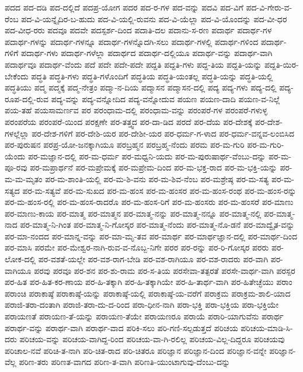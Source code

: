 {ಪದದ
ಪದ-ದಡಿ
ಪದ-ದಲ್ಲಿದೆ
ಪದಪ್ರ-ಯೋಗ
ಪದರ
ಪದ-ರ-ಗಳ
ಪದ-ವನ್ನು
ಪದವಿ
ಪದ-ವಿಗೆ
ಪದ-ವಿ-ಗೇರು-ವ-ರೆಂಬ
ಪದ-ವಿ-ಯನ್ನೈದಿರ-ಬ-ಹುದು
ಪದ-ವಿ-ಯಲ್ಲಿ-ರುವನು
ಪದ-ವಿ-ಯೆಲ್ಲಾ
ಪದ-ವಿ-ಯೊಂದನ್ನು
ಪದ-ವೀ-ಧರ
ಪದ-ವೀಧ-ರರು
ಪದವೂ
ಪದವೇ
ಪದಸ್ಪರ್ಶ-ದಿಂದ
ಪದಾತಿ-ದಲ
ಪದಾನು-ಸ-ರಣ
ಪದಾರ್ಥ
ಪದಾರ್ಥ-ಗಳ
ಪದಾರ್ಥ-ಗಳನ್ನು
ಪದಾರ್ಥ-ಗಳನ್ನೂ
ಪದಾರ್ಥ-ಗಳನ್ನೊದಗಿ-ಸಲು
ಪದಾರ್ಥ-ಗಳಲ್ಲಿ
ಪದಾರ್ಥ-ಗಳಿಂದ
ಪದಾರ್ಥ-ಗಳಿಗೆ
ಪದಾರ್ಥ-ಗಳು
ಪದಾರ್ಥ-ಗಳೆಲ್ಲಾ
ಪದಾರ್ಥದ
ಪದಾರ್ಥ-ದಲ್ಲಿಯೂ
ಪದಾರ್ಥ-ವನ್ನು
ಪದಾರ್ಥ-ವಾಗಿ
ಪದಾರ್ಥವೂ
ಪದಾರ್ಥ-ವೆಂದು
ಪದೆ
ಪದೇ
ಪದೇ-ಪದೇ
ಪದ್ದತಿ
ಪದ್ದತಿ-ಗಳು
ಪದ್ದ-ತಿಯ
ಪದ್ದತಿ-ಯನ್ನು
ಪದ್ದತಿ-ಯಿರ-ಬೇಕೆಂದು
ಪದ್ಧತಿ
ಪದ್ಧತಿ-ಗಳು
ಪದ್ಧತಿ-ಗಳೊಂದಿಗೆ
ಪದ್ಧತಿಯ
ಪದ್ಧತಿ-ಯಂತಲ್ಲ
ಪದ್ಧತಿ-ಯನ್ನು
ಪದ್ಧತಿ-ಯಲ್ಲಿ
ಪದ್ಧತಿಯು
ಪದ್ಮ
ಪದ್ಮಕ್ಕೆ
ಪದ್ಮ-ನೇತ್ರಂ
ಪದ್ಮಾ-ನ-ದಿಯ
ಪದ್ಮಾಸನ
ಪದ್ಮಾಸನ-ದಲ್ಲಿ
ಪದ್ಯ
ಪದ್ಯ-ಗಳು
ಪದ್ಯ-ದಲ್ಲಿ
ಪದ್ಯ-ರೂಪ-ದಲ್ಲಿ-ರುವ
ಪದ್ಯ-ವನ್ನು
ಪದ್ಯ-ವನ್ನೋದಿದ
ಪದ್ಯ-ವನ್ನೋದುವ
ಪಯಣ
ಪಯಣ-ದಾದಿ
ಪಯಣ-ವ-ನಿಲ್ಲೆ
ಪಯ-ತಹೆ
ಪಯಸಾಮರ್ಣವ
ಪರ
ಪರಂಧಾಮ-ದಲ್ಲಿ
ಪರಂಧಾಮ-ವನ್ನು
ಪರಂಪರೆ-ಗಳ
ಪರಂಪರೆ-ಗಳುಳ್ಳ
ಪರಂಪರೆಯ
ಪರಂಪರೆ-ಯಿಂದ
ಪರಕ್ಷಣೇ
ಪರ-ತತ್ತ್ವದ
ಪರ-ದಾ-ಡಿದ
ಪರದೆ
ಪರ-ದೆಯ
ಪರ-ದೇಶಕ್ಕೆ
ಪರ-ದೇಶ-ಗಳಲ್ಲೆಲ್ಲಾ
ಪರ-ದೇಶ-ಗಳಿಗೆ
ಪರ-ದೇಶಿ-ಯರ
ಪರ-ದೇಶೀ-ಯರ
ಪರ-ಧರ್ಮ-ಗ-ಳಾದ
ಪರ-ಧರ್ಮ-ವನ್ನವ-ಲಂಬಿಸಿದ
ಪರ-ಪುರುಷನ
ಪರಪ್ರ-ಯೋ-ಜನಕ್ಕಾಗಿಯೂ
ಪರಬ್ರಹ್ಮನ
ಪರಬ್ರಹ್ಮ-ನೆಂದು
ಪರಮ
ಪರ-ಮ-ಗುರಿ
ಪರ-ಮ-ಗುರಿ-ಯೆಂದು
ಪರ-ಮಜ್ಞಾನ-ದಲ್ಲಿ
ಪರ-ಮ-ಧರ್ಮ
ಪರ-ಮಧ್ವನಿ-ಯದು
ಪರ-ಮ-ಪುರುಷಾರ್ಥ-ವೆಂಬು-ದನ್ನು
ಪರ-ಮ-ಪೂ-ರವು
ಪರ-ಮಪ್ರಾರ್ಥನೆ
ಪರ-ಮಪ್ರೇಮಕ್ಕೆ
ಪರ-ಮಪ್ರೇಮ-ದಿಂದ
ಪರ-ಮ-ಭಕ್ತ-ರಾದ
ಪರ-ಮ-ಭಕ್ತಿ-ಯನ್ನು
ಪರ-ಮ-ಮ-ಮೃತಂ
ಪರ-ಮ-ಶಾಂತಿ-ಯಲ್ಲಿ
ಪರ-ಮ-ಶಿ-ವನು
ಪರ-ಮ-ಶಿವ-ನೆಂಬ
ಪರ-ಮಶ್ರೇಷ್ಠ
ಪರ-ಮ-ಸತ್ಯ
ಪರ-ಮ-ಸತ್ಯದ
ಪರ-ಮ-ಸತ್ಯವೆ
ಪರ-ಮ-ಸುಖದ
ಪರ-ಮ-ಹಂಸ
ಪರ-ಮ-ಹಂಸರ
ಪರ-ಮ-ಹಂಸ-ರಂಥ
ಪರ-ಮ-ಹಂಸ-ರನ್ನು
ಪರ-ಮ-ಹಂಸ-ರಲ್ಲಿ
ಪರ-ಮ-ಹಂಸ-ರಾದರೊ
ಪರ-ಮ-ಹಂಸ-ರಿಗೆ
ಪರ-ಮ-ಹಂಸರು
ಪರ-ಮ-ಹಂಸರೆ
ಪರ-ಮಾಣು
ಪರ-ಮಾಣು-ಕಾಯ
ಪರ-ಮಾತ್ಮ
ಪರ-ಮಾತ್ಮನ
ಪರ-ಮಾತ್ಮ-ನನ್ನು
ಪರ-ಮಾತ್ಮ-ನನ್ನೂ
ಪರ-ಮಾತ್ಮ-ನಲ್ಲಿ
ಪರ-ಮಾತ್ಮ-ನಾದ
ಪರ-ಮಾತ್ಮ-ನಿ-ಗಿಂತ
ಪರ-ಮಾತ್ಮ-ನಿ-ಗೋಸ್ಕರ
ಪರ-ಮಾತ್ಮ-ನೆಂದು
ಪರ-ಮಾತ್ಮ-ನೊ-ಡನೆ
ಪರ-ಮಾದ್ವೈತ-ವನ್ನು
ಪರ-ಮಾ-ನಂದದ
ಪರ-ಮಾನ್ನ-ವನ್ನು
ಪರ-ಮಾ-ಮೃ-ತವ
ಪರ-ಮಾರ್ಥ
ಪರ-ಮಾರ್ಥಜ್ಞಾನ-ದಲ್ಲಿ
ಪರ-ಮಾರ್ಥ-ದಿಂದ
ಪರ-ಮಾಸಿ
ಪರಮೇ
ಪರ-ಮೇಶ್ವರ-ನಾಗಿ-ರುವ-ವ-ನೊಬ್ಬ-ನಿಗೇ
ಪರರ
ಪರ-ರನ್ನು
ಪರ-ರಿ-ಗೋಸ್ಕರ
ಪರರು
ಪರ-ಲೋಕ-ದಲ್ಲಿ
ಪರ-ವಶತೆ-ಯಲ್ಲೇ
ಪರ-ವಶ-ರಾಗ-ಬೇಡಿ
ಪರ-ವಶ-ರಾಗಿಯೂ
ಪರ-ವಶ-ರಾದರು
ಪರ-ವಾಗಿ
ಪರ-ವಾಗಿಯೂ
ಪರವು
ಪರವೂ
ಪರ-ಶನ
ಪರ-ಶು-ರಾಮ
ಪರ-ಸ-ತಿಯ
ಪರಸೇವಾ-ತತ್ಪರತೆ
ಪರಸೇ-ವಾರ್ಥ-ವಾಗಿ
ಪರಸ್ಪರ
ಪರ-ಹಿತ
ಪರ-ಹಿತ-ಕರ-ಣಾಯ
ಪರ-ಹಿ-ತಕ್ಕಾಗಿ
ಪರ-ಹಿ-ತಕ್ಕಾಗಿಯೇ
ಪರ-ಹಿ-ತಾರ್ಥ-ವಾಗಿ
ಪರ-ಹಿತೇಚ್ಛೆಯು
ಪರಾಂ
ಪರಾಂಚಿ
ಪರಾಕಾಷ್ಠೆ
ಪರಾಕಾಷ್ಠೆ-ಯನ್ನು
ಪರಾಕಾಷ್ಠೆ-ಯಲ್ಲಿ
ಪರಾಕಾಷ್ಠೆ-ಯ-ವರೆಗೆ
ಪರಾಕ್ರಮ
ಪರಾಕ್ರಮ-ಶಾಲಿ-ಯಾದ
ಪರಾಜಿ-ತರಾ-ದಂತಾಗಿ
ಪರಾಜಿ-ತರಾ-ದು-ದ-ರಿಂದ
ಪರಾ-ಧೀನ-ನಾಗಿ
ಪರಾ-ಭಕ್ತಿ
ಪರಾ-ಭಕ್ತಿಯ
ಪರಾ-ಭಕ್ತಿಯೇ
ಪರಾಯಣತೆ
ಪರಾಯಣ-ತೆ-ಯನ್ನು
ಪರಾಯಣ-ತೆಯೇ
ಪರಾಯಣರೂ
ಪರಾಯೆ
ಪರಾರಿ-ಯಾಗುವೆನು
ಪರಾರ್ಥ
ಪರಾರ್ಥ-ವನ್ನು
ಪರಾರ್ಥ-ವಾಗಿ
ಪರಾರ್ಥ-ವಾದ
ಪರಿಕಿ-ಸಲು
ಪರಿ-ಗಣಿ-ಸಲ್ಪಡುತ್ತದೆ
ಪರಿಚಯ
ಪರಿಚಯ-ಮಾಡಿ-ಸಿ-ದರು
ಪರಿಚಯ-ವನ್ನು
ಪರಿಚಯ-ವಾಗಿದ್ದ-ರಿಂದ
ಪರಿಚಯ-ವಾ-ಗಿ-ರಲಿಲ್ಲ
ಪರಿಚಯ-ವಿಲ್ಲ-ದಿದ್ದರೂ
ಪರಿಚಯವು
ಪರಿಚಾಲ-ನವೆ
ಪರಿಚಿ-ತ-ನಾಗಿ
ಪರಿ-ಚಿತ-ರಾದ
ಪರಿ-ಚಿತರೂ
ಪರಿಜ್ಞಾನ
ಪರಿಜ್ಞಾನ-ದಿಂದ
ಪರಿಜ್ಞಾನ-ವನ್ನೇ
ಪರಿಜ್ಞಾನ-ವೆಲ್ಲ
ಪರಿಣ-ತರು
ಪರಿಣತ-ವಾಗದ
ಪರಿಣ-ತ-ವಾಗಿ
ಪರಿಣತಿ-ಯುಂಟಾಗುವು-ದೆಂಬು-ದನ್ನು
}
